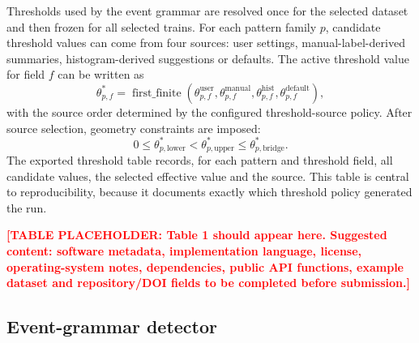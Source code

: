 \documentclass[pdflatex,sn-apa]{sn-jnl}
\newcommand{\TODOTAB}[1]{\par\medskip\noindent\textbf{\textcolor{red}{[TABLE PLACEHOLDER: #1]}}\par\medskip}
\begin{document}
Thresholds used by the event grammar are resolved once for the selected dataset and then frozen for all selected trains. For each pattern family $p$, candidate threshold values can come from four sources: user settings, manual-label-derived summaries, histogram-derived suggestions or defaults. The active threshold value for field $f$ can be written as
\begin{equation}
    \theta_{p,f}^{\ast}
    =
    \operatorname{first\_finite}
    \left(
    \theta_{p,f}^{\mathrm{user}},
    \theta_{p,f}^{\mathrm{manual}},
    \theta_{p,f}^{\mathrm{hist}},
    \theta_{p,f}^{\mathrm{default}}
    \right),
\end{equation}
with the source order determined by the configured threshold-source policy. After source selection, geometry constraints are imposed:
\begin{equation}
    0 \le \theta_{p,\mathrm{lower}}^{\ast}
    < \theta_{p,\mathrm{upper}}^{\ast}
    \le \theta_{p,\mathrm{bridge}}^{\ast}.
\end{equation}
The exported threshold table records, for each pattern and threshold field, all candidate values, the selected effective value and the source. This table is central to reproducibility, because it documents exactly which threshold policy generated the run.

\TODOTAB{Table 1 should appear here. Suggested content: software metadata, implementation language, license, operating-system notes, dependencies, public API functions, example dataset and repository/DOI fields to be completed before submission.}

\subsection{Event-grammar detector}
\end{document}
